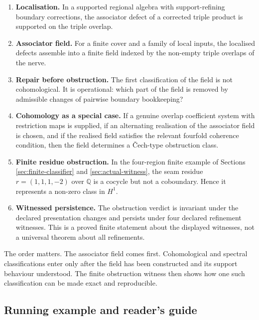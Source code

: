 \documentclass[11pt]{article}
\newcommand{\Q}{\mathbb{Q}}
\begin{document}
\begin{enumerate}[label=(\arabic*)]
\item \textbf{Localisation.} In a supported regional algebra with support-refining boundary corrections, the associator defect of a corrected triple product is supported on the triple overlap.

\item \textbf{Associator field.} For a finite cover and a family of local inputs, the localised defects assemble into a finite field indexed by the non-empty triple overlaps of the nerve.

\item \textbf{Repair before obstruction.} The first classification of the field is not cohomological. It is operational: which part of the field is removed by admissible changes of pairwise boundary bookkeeping?

\item \textbf{Cohomology as a special case.} If a genuine overlap coefficient system with restriction maps is supplied, if an alternating realisation of the associator field is chosen, and if the realised field satisfies the relevant fourfold coherence condition, then the field determines a \v{C}ech-type obstruction class.

\item \textbf{Finite residue obstruction.} In the four-region finite example of Sections \ref{sec:finite-classifier} and \ref{sec:actual-witness}, the seam residue \(r=(1,1,1,-2)\) over \(\Q\) is a cocycle but not a coboundary. Hence it represents a non-zero class in \(H^1\).

\item \textbf{Witnessed persistence.} The obstruction verdict is invariant under the declared presentation changes and persists under four declared refinement witnesses. This is a proved finite statement about the displayed witnesses, not a universal theorem about all refinements.
\end{enumerate}

The order matters. The associator field comes first. Cohomological and spectral classifications enter only after the field has been constructed and its support behaviour understood. The finite obstruction witness then shows how one such classification can be made exact and reproducible.

\subsection{Running example and reader's guide}
\end{document}
